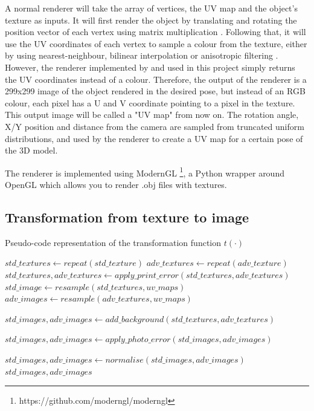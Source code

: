 A normal renderer will take the array of vertices, the UV map and the object's texture as inputs. It will first render the object by translating and rotating the position vector of each vertex using matrix multiplication \cite{opengl_shaders}. Following that, it will use the UV coordinates of each vertex to sample a colour from the texture, either by using nearest-neighbour, bilinear interpolation or anisotropic filtering \cite{opengl_textures}. However, the renderer implemented by \cite{ring_adversarial_3d} and used in this project simply returns the UV coordinates instead of a colour. Therefore, the output of the renderer is a 299x299 image of the object rendered in the desired pose, but instead of an RGB colour, each pixel has a U and V coordinate pointing to a pixel in the texture. This output image will be called a "UV map" from now on. The rotation angle, X/Y position and distance from the camera are sampled from truncated uniform distributions, and used by the renderer to create a UV map for a certain pose of the 3D model.

The renderer is implemented using ModernGL \footnote{https://github.com/moderngl/moderngl}, a Python wrapper around OpenGL which allows you to render .obj files with textures.

\subsection{Transformation from texture to image}
    \label{subsec:eot_transformation}
    
\begin{algorithm}
\caption{Pseudo-code representation of the transformation function $t(\cdot)$}
\label{alg:rendering}
\begin{algorithmic}[1]
\STATE $std\_textures \gets repeat(std\_texture)$
\STATE $adv\_textures \gets repeat(adv\_texture)$
    \STATE $std\_textures, adv\_textures \gets apply\_print\_error(std\_textures, adv\_textures)$
\ENDIF
\STATE $std\_image \gets resample(std\_textures, uv\_maps)$
\STATE $adv\_images \gets resample(adv\_textures, uv\_maps)$

\STATE $std\_images, adv\_images \gets add\_background(std\_textures, adv\_textures)$

    \STATE $std\_images, adv\_images \gets apply\_photo\_error(std\_images, adv\_images)$
\ENDIF

\STATE $std\_images, adv\_images \gets normalise(std\_images, adv\_images)$
\RETURN $std\_images, adv\_images$
\end{algorithmic}
\end{algorithm}

